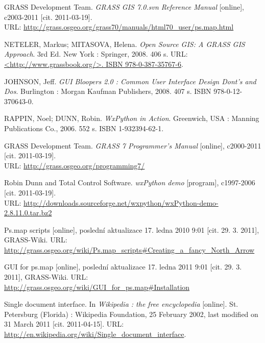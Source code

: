\documentclass[a4paper,12pt,draft]{article}
\begin{document}
{\begin{tabular}{ll}
\end{tabular}

\newpage
\renewcommand{\refname}{Použité zdroje}
\addcontentsline{toc}{section}{\refname}
\begin{thebibliography}{9}
\label{literatura}

GRASS Development Team. \textit{GRASS GIS 7.0.svn Reference
Manual} [online], c2003-2011 [cit. 2011-03-19].\\ URL:
\url{http://grass.osgeo.org/grass70/manuals/html70_user/ps.map.html}



NETELER, Markus; MITASOVA, Helena. \textit{Open Source GIS: A
GRASS GIS Approach}. 3rd Ed. New York : Springer, 2008. 406 s. URL:
\url{<http://www.grassbook.org/>. ISBN 978-0-387-35767-6}.

JOHNSON, Jeff. \textit{GUI Bloopers 2.0 : Common User Interface Design
Dont's and Dos}. Burlington : Morgan Kaufman Publishers, 2008. 407 s. ISBN
978-0-12-370643-0.

RAPPIN, Noel; DUNN, Robin. \emph{WxPython in Action}. Greenwich, USA : Manning
Publications Co., 2006. 552 s. ISBN 1-932394-62-1.

GRASS Development Team. \textit{GRASS 7 Programmer's Manual} [online],
c2000-2011 [cit. 2011-03-19].\\ URL: \url{http://grass.osgeo.org/programming7/}

Robin Dunn and Total Control Software. \textit{wxPython
demo} [program], c1997-2006 [cit. 2011-03-19].\\ URL:
\url{http://downloads.sourceforge.net/wxpython/wxPython-demo-2.8.11.0.tar.bz2}

Ps.map scripts [online], poslední aktualizace
17. ledna 2010 9:01 [cit. 29. 3. 2011], GRASS-Wiki. URL:
\url{http://grass.osgeo.org/wiki/Ps.map_scripts#Creating_a_fancy_North_Arrow}

GUI for ps.map [online], poslední aktualizace
17. ledna 2011 9:01 [cit. 29. 3. 2011], GRASS-Wiki. URL:
\url{http://grass.osgeo.org/wiki/GUI_for_ps.map#Installation}

Single document interface. In \emph{Wikipedia : the free encyclopedia} [online].
St. Petersburg (Florida) : Wikipedia Foundation, 25 February 2002, last modified
on 31 March 2011 [cit. 2011-04-15]. URL:
\url{http://en.wikipedia.org/wiki/Single_document_interface}.


\end{thebibliography}}
\end{document}
